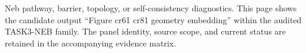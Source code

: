 Neb pathway, barrier, topology, or self-consistency diagnostics. This page shows the candidate output ``Figure cr61 cr81 geometry embedding'' within the audited TASK3-NEB family. The panel identity, source scope, and current status are retained in the accompanying evidence matrix.
